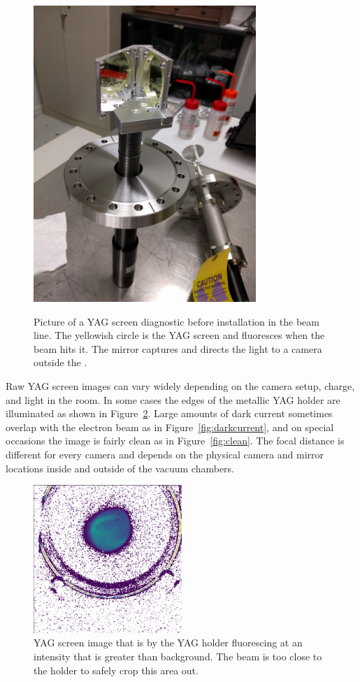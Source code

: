 \begin{figure}
	\centering
	\includegraphics[width=0.75\textwidth]{images/YAG_screen}
	\label{fig:YAGscreen}
	\caption{Picture of a YAG screen diagnostic before installation in the beam line.
	The yellowish circle is the YAG screen and fluoresces when the beam hits it. 
	The mirror captures and directs the light to a camera  outside the .}
\end{figure}
Raw YAG screen images can vary widely depending on the camera setup, charge, and 
light in the room. In some cases the edges of the metallic YAG holder
 are illuminated as shown in Figure~\ref{fig:yag-holder}.
Large amounts of dark current sometimes overlap with the electron beam as in Figure~\ref{fig:darkcurrent}, 
and on special occasions the image is fairly clean as in Figure~\ref{fig:clean}. 
The focal distance is different for every camera and depends on the physical camera and mirror
locations inside and outside of the vacuum chambers.
\begin{figure}	
	\centering
	\includegraphics[width=0.5\textwidth]{images/yag-in-image}
	\caption{YAG screen image that is  by the YAG holder fluorescing at an intensity that is greater than 
		background. The beam is too close to the holder to safely crop this area out.}
	\label{fig:yag-holder}
\end{figure}
